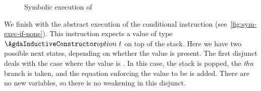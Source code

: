 \begin{comment}
  \listref{a-ITER'} shows some symbolic execution rules for the
  \verb/ITER'/ instruction: Generally, when no further information
  about the relevant list variable is present, symbolic execution will
  lead to a disjunction that considers both possibilities.  But if
  some relevant information is known about that variable, the
  disjunction as well as the context extension can be avoided.

  \begin{listing}[!ht]
\begin{verbatim}
αprog-step {Γ} α@(αstate αen (ITER' {ty} x ∙ prg) rVM (l∈ ∷ sVM) Φ)
  = [ _ , record α{ prg = prg ; sVM = sVM 
                  ;   Φ = [ l∈ := func (NIL ty) [M] // Φ ] }
    / [ ty / list ty // Γ ]
    , αstate (wkαE αen) (x ;∙ ITER' x ∙ prg) (0∈ ∷ wkM rVM) (1∈ ∷ wkM sVM)
             [ 2+ l∈ := func CONS (0∈ ∷ 1∈ ∷ [M]) // wkΦ Φ ] ]

  ITER'c : ∀ {αen ty l∈ x∈ xs∈ Φ rS sS iterate prg rVM sVM}
         → l∈ := func CONS (x∈ ∷ xs∈ ∷ [M])  ∈  Φ
         → αρ-special
               (αstate αen (ITER' {ty} {rS} {sS} x ∙ prg) rVM  (l∈ ∷ sVM) Φ)
           (_ , αstate αen (x ;∙ ITER' x ∙ prg)    (x∈ ∷ rVM) (xs∈ ∷ sVM) Φ)
\end{verbatim}
\caption{Exemplary symbolic execution rules for ITER'}
\label{a-ITER'}
\end{listing}

It is possible to reach the same logical conclusions as
\verb/αρ-special/ by first performing a generic symbolic execution
step with \verb/αprog-step/ and then applying some first order
conclusions on the resulting formula.  For example in the case of
\verb/ITER'/, if it is known that \verb/l∈/ is \verb/CONS/ and the
first disjunct from \verb/αprog-step/ adds the clause that sets it
equal to \verb/NIL/, a contradiction can be concluded from these two
clauses and the entire disjunct can be set to false and discarded.

Such rules and their soundness have already been successfully
implemented and proven in an earlier version of the model.  But since
they come at a great performance cost by requiring more conclusion
steps and creating new redundant variables most of the time, these
rules where replaced by the given special relation transitions during
a major rework of the model.
\end{comment}

\begin{figure}[tp]
  \AbstractProgStepIFNONE
  \caption{Symbolic execution of }
  \label{fig:sym-exec-if-none}
\end{figure}
We finish with the abstract execution of the conditional instruction
 (see~\autoref{fig:sym-exec-if-none}). This instruction
expects a value of type $\ACon{option}~t$ on top of the stack. Here we have two
possible next states, depending on whether the value is present. The
first disjunct deals with the case where the value is . In
this case, the stack is popped, the \emph{thn} branch is taken, and
the equation enforcing the value to be  is added. There are
no new variables, so there is no weakening in this disjunct.

